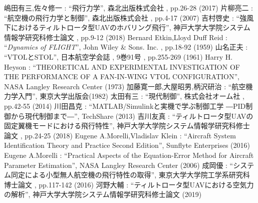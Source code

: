 
\begin{thebibliography}{99}


嶋田有三,佐々修一 : ``飛行力学'', 森北出版株式会社 , pp.26-28 (2017)
片柳亮二 : ``航空機の飛行力学と制御'', 森北出版株式会社 , pp.4-17 (2007)
吉村啓史 : ``強風下におけるティルトロータ型UAVのホバリング飛行'', 神戸大学大学院システム情報学研究科修士論文 , pp.9-12 (2018)
Bernard Etkin,Lloyd Duff Reid : ``\textit{Dynamics of FLIGHT}'', John Wiley & Sons. Inc. , pp.18-92 (1959)
山名正夫 : ``VTOLとSTOL'', 日本航空学会誌 , 9巻91号 , pp.255-269 (1961)
Harry H. Heyson : ``THEORETICAL AND EXPERIMENTAL INVESTIGATION OF THE PERFORMANCE OF A FAN-IN-WING VTOL CONFIGURATION'', NASA Langley Research Center (1973)
加藤寛一郎,大屋昭男,柄沢研治 : ``航空機力学入門'', 東京大学出版会(1982)
太田有三 : ``現代制御'', 株式会社オーム社 , pp.42-55 (2014)
川田昌克 : ``MATLAB/Simulinkと実機で学ぶ制御工学 ―PID制御から現代制御まで―'', TechShare (2013)
吉川友真 : ``ティルトロータ型UAVの固定翼機モードにおける飛行特性'', 神戸大学大学院システム情報学研究科修士論文 , pp.24-25 (2018)
Eugene A.Morelli,Vladislav Klein : ``Aircraft System Identification Theory and Practice Second Edition'', Sunflyte Enterprises (2016)
Eugene A.Morelli : ``Practical Aspects of the Equation-Error Method for Aircraft Parameter Estimation'', NASA Langley Research Center (2006)
成岡優 : ``システム同定による小型無人航空機の飛行特性の取得'', 東京大学大学院工学系研究科博士論文 , pp.117-142 (2016)
河野大輔 : ``ティルトロータ型UAVにおける空気力の解析'', 神戸大学大学院システム情報学研究科修士論文 (2019)

\end{thebibliography}

\newpage
